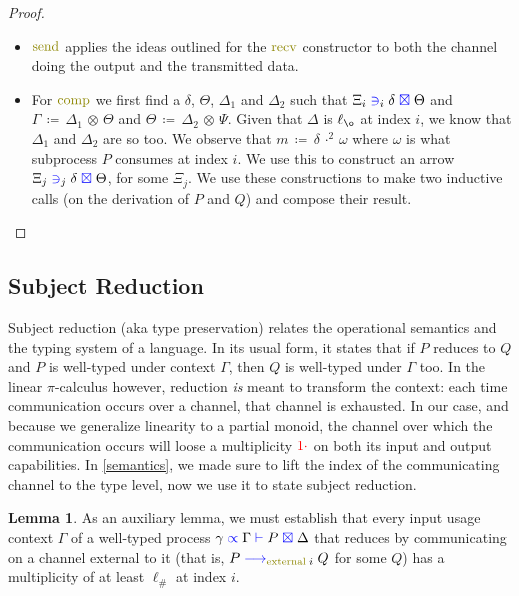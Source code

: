\documentclass[a4paper,UKenglish,cleveref, autoref, thm-restate,authorcolumns]{lipics-v2019}
\theoremstyle{definition}
\newtheorem{nilemma}[theorem]{Lemma}
\newcommand{\picalc}{$\pi$-calculus}
\newcommand{\type}[1]{\textcolor{blue}{\operatorname{#1}}}
\newcommand{\constr}[1]{\textcolor{olive}{\operatorname{#1}}}
\newcommand{\field}[1]{\textcolor{red}{\operatorname{#1}}}
\newcommand{\opsquared}[3]{#1 \, \coloneqq \, #2 \, \cdot^2 \, #3}
\newcommand{\opctx}[3]{#1 \, \coloneqq \, #2 \, \otimes \, #3}
\newcommand{\one}{\field{1\cdot}}
\newcommand{\lz}{\ell_{\o}}
\newcommand{\lio}{\ell_{\#}}
\newcommand{\reduce}[1]{\; \type{\longrightarrow}_{#1} \;}
\newcommand{\types}[4]{#1 \; \type{\propto} \; #2 \; \type{\vdash} \; #3 \; \type{\boxtimes} \; #4}
\newcommand{\containsusage}[4]{#1 \; \type{\ni}_{#2} \; #3 \; \type{\boxtimes} \; #4}
\begin{document}
\begin{proof}
\begin{itemize}
    \item
      $\constr{send}$ applies the ideas outlined for the $\constr{recv}$ constructor to both the channel doing the output and the transmitted data.

    \item
      For $\constr{comp}$ we first find a $\delta$, $\Theta$, $\Delta_1$ and $\Delta_2$ such that $\containsusage{\Xi_i}{i}{\delta}{\Theta}$ and $\opctx{\Gamma}{\Delta_1}{\Theta}$ and $\opctx{\Theta}{\Delta_2}{\Psi}$.
      Given that $\Delta$ is $\lz$ at index $i$, we know that $\Delta_1$ and $\Delta_2$ are so too.
      We observe that $\opsquared{m}{\delta}{\omega}$ where $\omega$ is what subprocess $P$ consumes at index $i$.
      We use this to construct an arrow $\containsusage{\Xi_j}{j}{\delta}{\Theta}$, for some $\Xi_j$.
      We use these constructions to make two inductive calls (on the derivation of $P$ and $Q$) and compose their result.
  \end{itemize}  
\end{proof}


\subsection{Subject Reduction}
\label{subject-reduction}

Subject reduction (aka type preservation) relates the operational semantics and the typing system of a language.
In its usual form, it states that if $P$ reduces to $Q$ and $P$ is well-typed under context $\Gamma$, then $Q$ is well-typed under $\Gamma$ too.
In the linear \picalc{} however, reduction \emph{is} meant to transform the context: each time communication occurs over a channel, that channel is exhausted.
In our case, and because we generalize linearity to a partial monoid, the channel over which the communication occurs will loose a multiplicity $\one$ on both its input and output capabilities.
In  \autoref{semantics}, we made sure to lift the index of the communicating channel to the type level, now we use it to state subject reduction.

\begin{nilemma}
  \label{lm:comm-capable}
  As an auxiliary lemma, we must establish that every input usage context $\Gamma$ of a well-typed process $\types{\gamma}{\Gamma}{P}{\Delta}$ that reduces by communicating on a channel external to it (that is, $P \reduce{\constr{external} \; i} Q$ for some $Q$) has a multiplicity of at least $\lio$ at index $i$.
\end{nilemma}
\end{document}
